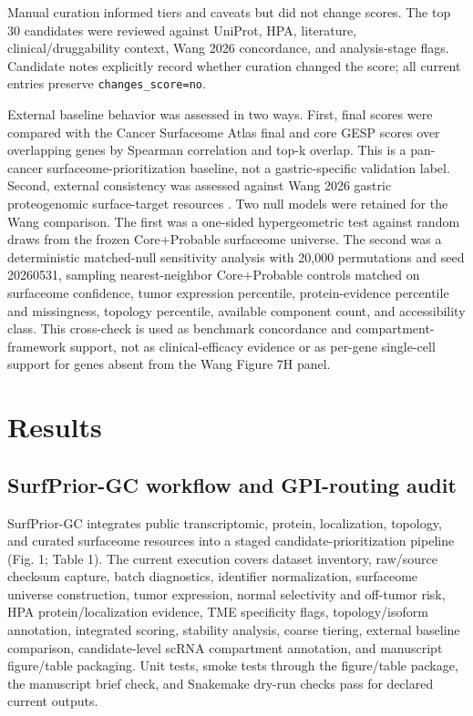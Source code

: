 \documentclass[preprint,12pt,authoryear]{elsarticle}
\begin{document}
Manual curation informed tiers and caveats but did not change scores. The top 30 candidates were reviewed against UniProt, HPA, literature, clinical/\allowbreak{}druggability context, Wang 2026 concordance, and analysis-stage flags. Candidate notes explicitly record whether curation changed the score;\allowbreak{} all current entries preserve \texttt{changes\_\allowbreak{}score=no}.

External baseline behavior was assessed in two ways. First, final scores were compared with the Cancer Surfaceome Atlas final and core GESP scores \citep{hu2021surfaceome} over overlapping genes by Spearman correlation and top-k overlap. This is a pan-cancer surfaceome-prioritization baseline, not a gastric-specific validation label. Second, external consistency was assessed against Wang 2026 gastric proteogenomic surface-target resources \citep{wang2026gastric}. Two null models were retained for the Wang comparison. The first was a one-sided hypergeometric test against random draws from the frozen Core+\allowbreak{}Probable surfaceome universe. The second was a deterministic matched-null sensitivity analysis with 20,000 permutations and seed 20260531, sampling nearest-neighbor Core+\allowbreak{}Probable controls matched on surfaceome confidence, tumor expression percentile, protein-evidence percentile and missingness, topology percentile, available component count, and accessibility class. This cross-check is used as benchmark concordance and compartment-framework support, not as clinical-efficacy evidence or as per-gene single-cell support for genes absent from the Wang Figure 7H panel.

\FloatBarrier
\section{Results}

\subsection{SurfPrior-GC workflow and GPI-routing audit}

SurfPrior-GC integrates public transcriptomic, protein, localization, topology, and curated surfaceome resources into a staged candidate-prioritization pipeline (Fig. 1;\allowbreak{} Table 1). The current execution covers dataset inventory, raw/\allowbreak{}source checksum capture, batch diagnostics, identifier normalization, surfaceome universe construction, tumor expression, normal selectivity and off-tumor risk, HPA protein/\allowbreak{}localization evidence, TME specificity flags, topology/\allowbreak{}isoform annotation, integrated scoring, stability analysis, coarse tiering, external baseline comparison, candidate-level scRNA compartment annotation, and manuscript figure/\allowbreak{}table packaging. Unit tests, smoke tests through the figure/\allowbreak{}table package, the manuscript brief check, and Snakemake dry-run checks pass for declared current outputs.
\end{document}
